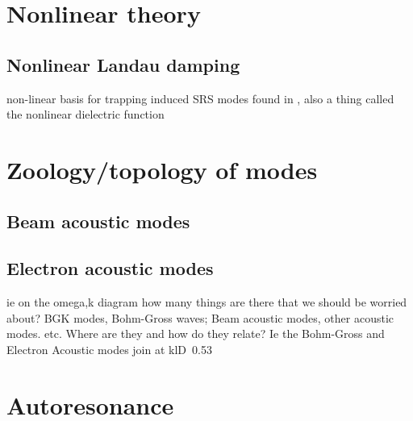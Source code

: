\section{Nonlinear theory}
\subsection{Nonlinear Landau damping}
non-linear basis for trapping induced SRS modes found in \cite{Rose2001}, also a thing called the nonlinear dielectric function



\section{Zoology/topology of modes}
\subsection{Beam acoustic modes}
\subsection{Electron acoustic modes}
ie on the omega,k diagram how many things are there that we should be worried about? BGK modes, Bohm-Gross waves; Beam acoustic modes, other acoustic modes. etc. Where are they and how do they relate? Ie the Bohm-Gross and Electron Acoustic modes join at klD~0.53

\section{Autoresonance}
